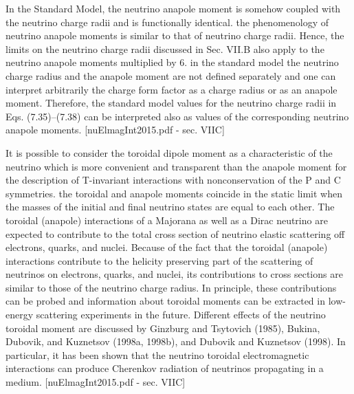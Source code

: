 In the Standard Model, the neutrino anapole moment is somehow coupled with the neutrino charge radii and is functionally identical. the phenomenology of neutrino anapole moments is similar to that of neutrino charge radii. Hence, the limits on the neutrino charge radii discussed in Sec. VII.B also apply to the neutrino anapole moments multiplied by 6.  in the standard model the neutrino charge radius and the anapole moment are not defined separately and one can interpret arbitrarily the charge form factor as a charge radius or as an anapole moment. Therefore, the standard model values for the neutrino charge radii in Eqs. (7.35)–(7.38) can be interpreted also as values of the corresponding neutrino anapole moments. [nuElmagInt2015.pdf - sec. VIIC]

It is possible to consider  the toroidal dipole moment as a characteristic of the neutrino which is more convenient and transparent than the anapole moment for the description of T-invariant interactions with nonconservation of the P and C symmetries. the toroidal and anapole moments coincide in the static limit when the masses of the initial and final neutrino states are equal to each other. The toroidal (anapole) interactions of a Majorana as well as a Dirac neutrino are expected to contribute to the total cross section of neutrino elastic scattering off electrons, quarks, and nuclei. Because of the fact that the toroidal (anapole) interactions contribute to the helicity preserving part of the scattering of neutrinos on electrons, quarks, and nuclei, its contributions to cross sections are similar to those of the neutrino charge radius. In principle, these contributions can be probed and information about toroidal moments can be extracted in low-energy scattering experiments in the future. Different effects of the neutrino toroidal moment are discussed by Ginzburg and Tsytovich (1985), Bukina, Dubovik, and Kuznetsov (1998a, 1998b), and Dubovik and Kuznetsov (1998). In particular, it has been shown that the neutrino toroidal electromagnetic interactions can produce Cherenkov radiation of neutrinos propagating in a medium. [nuElmagInt2015.pdf - sec. VIIC]


